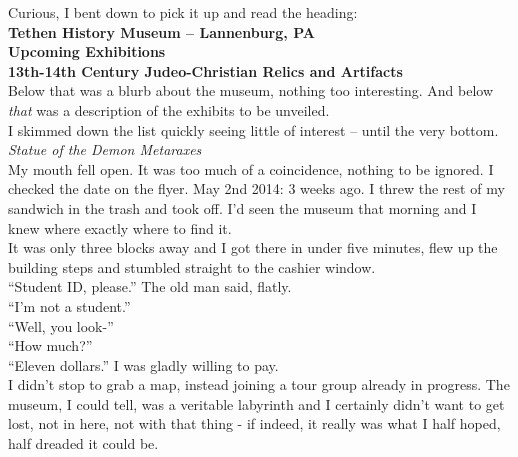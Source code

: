 \documentclass[a5paper]{scrartcl}
\begin{document}
Curious, I bent down to pick it up and read the heading:\\


\textbf{Tethen History Museum -- Lannenburg, PA}
\\


\textbf{Upcoming Exhibitions}
\\


\textbf{13th-14th Century Judeo-Christian Relics and Artifacts}
\\


Below that was a blurb about the museum, nothing too interesting. And below \textit{that}
 was a description of the exhibits to be unveiled.\\


I skimmed down the list quickly seeing little of interest -- until the very bottom.\\


\textit{Statue of the Demon Metaraxes}
\\


My mouth fell open. It was too much of a coincidence, nothing to be ignored. I checked the date on the flyer. May 2nd 2014: 3 weeks ago. I threw the rest of my sandwich in the trash and took off. I'd seen the museum that morning and I knew where exactly where to find it.\\


It was only three blocks away and I got there in under five minutes, flew up the building steps and stumbled straight to the cashier window.\\


\enquote{Student ID, please.} The old man said, flatly.\\


\enquote{I'm not a student.}\\


\enquote{Well, you look-}\\


\enquote{How much?}\\


\enquote{Eleven dollars.} I was gladly willing to pay.\\


I didn't stop to grab a map, instead joining a tour group already in progress. The museum, I could tell, was a veritable labyrinth and I certainly didn't want to get lost, not in here, not with that thing - if indeed, it really was what I half hoped, half dreaded it could be.\\
\end{document}
